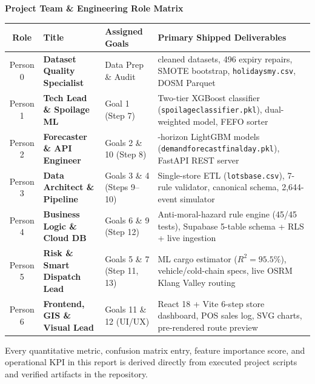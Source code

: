 \documentclass[11pt,a4paper]{article}
\renewcommand{\_}{\oldunderscore\allowbreak}
\begin{document}
\begin{titlepage}
    \vspace{4.5mm}
    {\small\bfseries\color{NavyPrimary}Project Team \& Engineering Role Matrix}\\[3pt]
    \renewcommand{\arraystretch}{1.12}
    {\scriptsize
    \begin{tabularx}{\textwidth}{@{} c >{\bfseries}l l >{\raggedright\arraybackslash}X @{}}
        \toprule
        \rowcolor{NavyPrimary}
        \color{white}\textbf{Role} & \color{white}\textbf{Title} & \color{white}\textbf{Assigned Goals} & \color{white}\textbf{Primary Shipped Deliverables} \\
        \midrule
        Person 0 & Dataset Quality Specialist & Data Prep \& Audit & 12 cleaned datasets, 496 expiry repairs, SMOTE bootstrap, \texttt{holidays\_my.csv}, DOSM Parquet \\
        \rowcolor{LightBg}
        Person 1 & Tech Lead \& Spoilage ML & Goal 1 (Step 7) & Two-tier XGBoost classifier (\texttt{spoilage\_classifier.pkl}), dual-weighted model, FEFO sorter \\
        Person 2 & Forecaster \& API Engineer & Goals 2 \& 10 (Step 8) & 3-horizon LightGBM models (\texttt{demand\_forecast\_final\_day\_*.pkl}), FastAPI REST server \\
        \rowcolor{LightBg}
        Person 3 & Data Architect \& Pipeline & Goals 3 \& 4 (Steps 9--10) & Single-store ETL (\texttt{lots\_base.csv}), 7-rule validator, canonical schema, 2,644-event simulator \\
        Person 4 & Business Logic \& Cloud DB & Goals 6 \& 9 (Step 12) & Anti-moral-hazard rule engine (45/45 tests), Supabase 5-table schema + RLS + live ingestion \\
        \rowcolor{LightBg}
        Person 5 & Risk \& Smart Dispatch Lead & Goals 5 \& 7 (Step 11, 13) & ML cargo estimator ($R^2 = 95.5\%$), vehicle/cold-chain specs, live OSRM Klang Valley routing \\
        Person 6 & Frontend, GIS \& Visual Lead & Goals 11 \& 12 (UI/UX) & React 18 + Vite 6-step store dashboard, POS sales log, SVG charts, pre-rendered route preview \\
        \bottomrule
    \end{tabularx}}

    \vfill
    \begin{center}
        {\scriptsize\color{SlateMuted}Every quantitative metric, confusion matrix entry, feature importance score, and operational KPI in this report is derived directly from executed project scripts and verified artifacts in the repository.}
    \end{center}
\end{titlepage}
\end{document}
